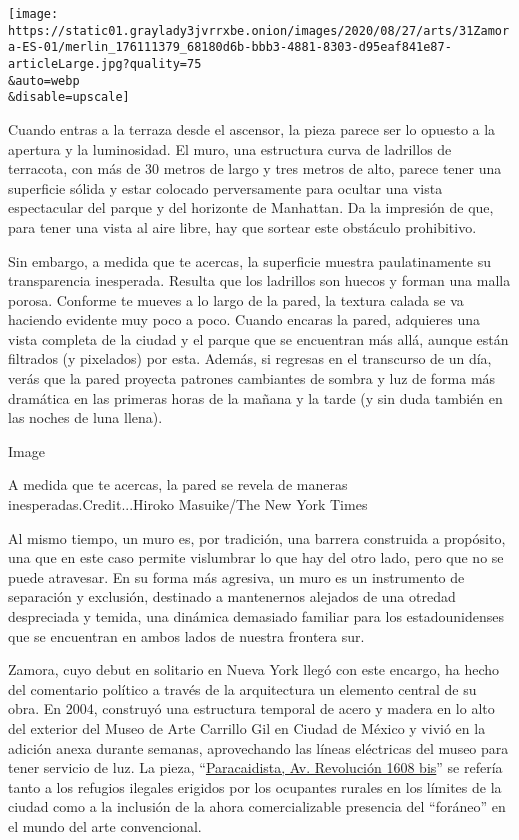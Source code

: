 \texttt{[image: https://static01.graylady3jvrrxbe.onion/images/2020/08/27/arts/31Zamora-ES-01/merlin\_176111379\_68180d6b-bbb3-4881-8303-d95eaf841e87-articleLarge.jpg?quality=75\\\&auto=webp\\\&disable=upscale]}

Cuando entras a la terraza desde el ascensor, la pieza parece ser lo
opuesto a la apertura y la luminosidad. El muro, una estructura curva de
ladrillos de terracota, con más de 30 metros de largo y tres metros de
alto, parece tener una superficie sólida y estar colocado perversamente
para ocultar una vista espectacular del parque y del horizonte de
Manhattan. Da la impresión de que, para tener una vista al aire libre,
hay que sortear este obstáculo prohibitivo.

Sin embargo, a medida que te acercas, la superficie muestra
paulatinamente su transparencia inesperada. Resulta que los ladrillos
son huecos y forman una malla porosa. Conforme te mueves a lo largo de
la pared, la textura calada se va haciendo evidente muy poco a poco.
Cuando encaras la pared, adquieres una vista completa de la ciudad y el
parque que se encuentran más allá, aunque están filtrados (y pixelados)
por esta. Además, si regresas en el transcurso de un día, verás que la
pared proyecta patrones cambiantes de sombra y luz de forma más
dramática en las primeras horas de la mañana y la tarde (y sin duda
también en las noches de luna llena).

Image

A medida que te acercas, la pared se revela de maneras
inesperadas.Credit...Hiroko Masuike/The New York Times

Al mismo tiempo, un muro es, por tradición, una barrera construida a
propósito, una que en este caso permite vislumbrar lo que hay del otro
lado, pero que no se puede atravesar. En su forma más agresiva, un muro
es un instrumento de separación y exclusión, destinado a mantenernos
alejados de una otredad despreciada y temida, una dinámica demasiado
familiar para los estadounidenses que se encuentran en ambos lados de
nuestra frontera sur.

Zamora, cuyo debut en solitario en Nueva York llegó con este encargo, ha
hecho del comentario político a través de la arquitectura un elemento
central de su obra. En 2004, construyó una estructura temporal de acero
y madera en lo alto del exterior del Museo de Arte Carrillo Gil en
Ciudad de México y vivió en la adición anexa durante semanas,
aprovechando las líneas eléctricas del museo para tener servicio de luz.
La pieza,
``\href{https://lsd.com.mx/artwork/paracaidista-av-revolucion-1608-bis/}{Paracaidista,
Av. Revolución 1608 bis}'' se refería tanto a los refugios ilegales
erigidos por los ocupantes rurales en los límites de la ciudad como a la
inclusión de la ahora comercializable presencia del ``foráneo'' en el
mundo del arte convencional.

